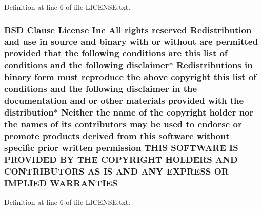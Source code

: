 Definition at line 6 of file L\+I\+C\+E\+N\+S\+E.\+txt.

\subsubsection[{\texorpdfstring{W\+A\+R\+R\+A\+N\+T\+I\+ES}{WARRANTIES}}]{\setlength{\rightskip}{0pt plus 5cm}B\+SD Clause License Inc All rights reserved Redistribution and use in source and binary with or without are permitted provided that the following conditions are this list of conditions and the following disclaimer$\ast$ Redistributions in binary form must reproduce the above copyright this list of conditions and the following disclaimer in the documentation and or other materials provided with the distribution$\ast$ Neither the name of the copyright holder nor the names of its contributors may be used to endorse or promote products derived from this software without specific prior written permission T\+H\+IS S\+O\+F\+T\+W\+A\+RE IS P\+R\+O\+V\+I\+D\+ED BY T\+HE C\+O\+P\+Y\+R\+I\+G\+HT H\+O\+L\+D\+E\+RS A\+ND C\+O\+N\+T\+R\+I\+B\+U\+T\+O\+RS AS IS A\+ND A\+NY E\+X\+P\+R\+E\+SS OR I\+M\+P\+L\+I\+ED W\+A\+R\+R\+A\+N\+T\+I\+ES}\hypertarget{LICENSE_8txt_a8472295fc7dc3e152751655a351cab17}{}\label{LICENSE_8txt_a8472295fc7dc3e152751655a351cab17}


Definition at line 6 of file L\+I\+C\+E\+N\+S\+E.\+txt.

